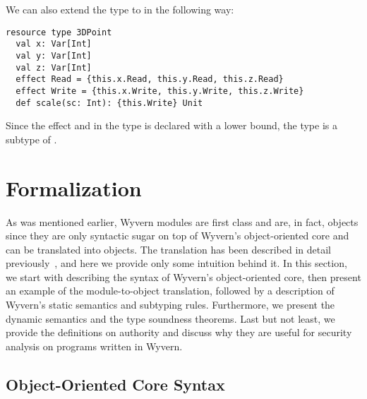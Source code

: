 We can also extend the type  to  in the following way:
\begin{lstlisting}[numbers=none]
resource type 3DPoint
  val x: Var[Int]
  val y: Var[Int]
  val z: Var[Int]
  effect Read = {this.x.Read, this.y.Read, this.z.Read}
  effect Write = {this.x.Write, this.y.Write, this.z.Write}
  def scale(sc: Int): {this.Write} Unit
\end{lstlisting}
Since the effect  and  in the type  is declared with a lower bound, the type  is a subtype of .








\section{Formalization}
\label{sec:formalization}

As was mentioned earlier, Wyvern modules are first class and are, in fact, objects since they are only syntactic sugar on top of Wyvern's object-oriented core and can be translated into objects. The translation has been described in detail previously~\cite{melicher17}, and here we provide only some intuition behind it. In this section, we start with describing the syntax of Wyvern's object-oriented core, then present an example of the module-to-object translation, followed by a description of Wyvern's static semantics and subtyping rules.  Furthermore, we present the dynamic semantics and the type soundness theorems. Last but not least, we provide the definitions on authority and discuss why they are useful for security analysis on programs written in Wyvern.



\subsection{Object-Oriented Core Syntax}

